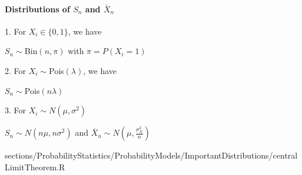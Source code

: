 		\paragraph{Distributions of $S_n$ and $\bar{X}_n$}
				\RTheory%
				{%
				 1. For  $X_i \in \{ 0,1 \}$, we have
				 \begin{center}
				 $S_n \sim $Bin$(n,\pi)$ with $\pi = P(X_i=1)$\\
				 \end{center}
				 2. For $X_i \sim$Pois$(\lambda)$, we have
				 \begin{center}
				  $S_n \sim$Pois$(n\lambda)$\\
				 \end{center}				 
				 3. For $X_i \sim N(\mu,\sigma^2)$
				 \begin{center}
				  $S_n \sim N(n\mu,n\sigma^2)$ and $\bar{X}_n \sim N(\mu, \frac{\sigma_{X}^{2}}{n})$\\
				 \end{center}				 
				}{sections/ProbabilityStatistics/ProbabilityModels/ImportantDistributions/centralLimitTheorem.R}